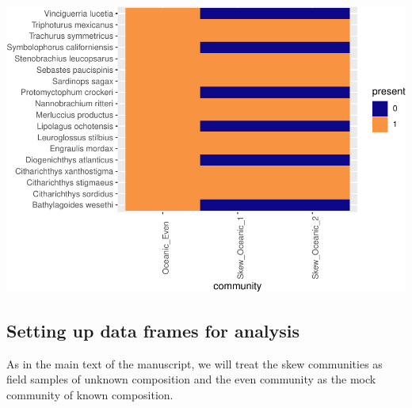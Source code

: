 \documentclass[
]{article}
\begin{document}
\includegraphics{Appendix_S4_files/figure-latex/which_sp-1.pdf}

\hypertarget{setting-up-data-frames-for-analysis}{%
\subsection{Setting up data frames for
analysis}\label{setting-up-data-frames-for-analysis}}

As in the main text of the manuscript, we will treat the skew
communities as field samples of unknown composition and the even
community as the mock community of known composition.
\end{document}
